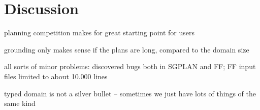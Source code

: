 \section{Discussion} \label{sec:discussion}


planning competition makes for great starting point for users

grounding only makes sense if the plans are long, compared to the
domain size

all sorts of minor problems: discovered bugs both in SGPLAN and FF;
FF input files limited to about 10.000 lines

typed domain is not a silver bullet -- sometimes we just have lots of
things of the same kind

